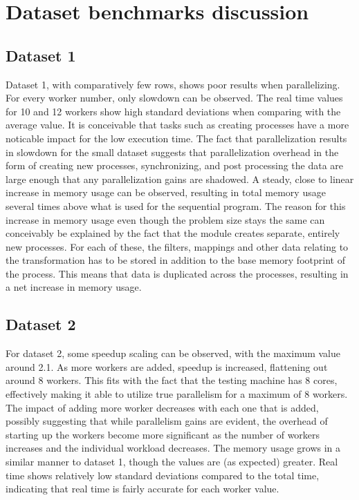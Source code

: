 \section{Dataset benchmarks discussion}
\subsection{Dataset 1}
Dataset 1, with comparatively few rows, shows poor results when parallelizing. For every worker number, only slowdown can be observed.
The real time values for 10 and 12 workers show high standard deviations when comparing with the average value. It is conceivable that
tasks such as creating processes have a more noticable impact for the low execution time. The fact that parallelization results in
slowdown for the small dataset suggests that parallelization overhead in the form of creating new processes, synchronizing, and
post processing the data are large
enough that any parallelization gains are shadowed. A steady, close to linear increase in memory usage can be observed, resulting in
total memory usage several times above what is used for the sequential program. The reason for this increase in memory usage even though
the problem size stays the same can conceivably be explained by the fact that the  module creates separate, entirely
new processes. For each of these, the filters, mappings and other data relating to the transformation has to be stored in addition to the
base memory footprint of the process. This means that data is duplicated across the processes, resulting in a net increase in memory usage.

\subsection{Dataset 2}
For dataset 2, some speedup scaling can be observed, with the maximum value around 2.1. As more workers are added, speedup is increased,
flattening out around 8 workers. This fits with the fact that the testing machine has 8 cores, effectively making it able to utilize 
true parallelism for a maximum of 8 workers. The impact of adding more worker decreases with each one that is added, possibly suggesting
that while parallelism gains are evident, the overhead of starting up the workers become more significant as the number of workers increases
and the individual workload decreases. The memory usage grows in a similar manner to dataset 1, though the values are (as expected) greater.
Real time shows relatively low standard deviations compared to the total time, indicating that real time is fairly accurate for each worker
value.

